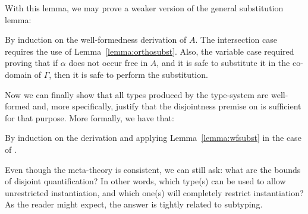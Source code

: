 With this lemma, we may prove a weaker version of the general substitution lemma:

%
{By induction on the well-formedness derivation of $A$.
The intersection case requires the use of Lemma~\ref{lemma:orthosubst}.
Also, the variable case required proving that if $\alpha$ does not occur free in $A$, and it is safe
to substitute it in the co-domain of $\Gamma$, then it is safe to perform the substitution.}

Now we can finally show that all types produced by the type-system are well-formed and,
more specifically, justify that the disjointness premise on  is sufficient for that 
purpose.
More formally, we have that:

{By induction on the derivation and applying
  Lemma~\ref{lemma:wfsubst} in the case of .}

Even though the meta-theory is consistent, we can still ask: 
what are the bounds of disjoint quantification?
In other words, which type(s) can be used to allow unrestricted instantiation, and which
one(s) will completely restrict instantiation?
As the reader might expect, the answer is tightly related to subtyping. 

